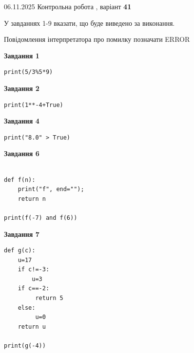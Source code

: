 \documentclass[12pt, ukrainian]{article}
\begin{document}
{\Large{06.11.2025 Контрольна робота , варіант  \No \textbf { 41 }\par}}
{
\begin {large}
У завданнях 1-9 вказати, що буде виведено за виконання.

Повідомлення інтерпретатора про помилку позначати ERROR

\begin{minipage}[t]{7.5cm}

\begin{center}
\textbf{Завдання 1}
\end{center}

\begin{verbatim}
print(5/3%5*9)
\end{verbatim}



\begin{center}
\textbf{Завдання 2}
\end{center}

\begin{verbatim}
print(1**-4+True)
\end{verbatim}



\begin{center}
\textbf{Завдання 4}
\end{center}

\begin{verbatim}
print("8.0" > True)
\end{verbatim}



\begin{center}
\textbf{Завдання 6}
\end{center}

\begin{verbatim}

def f(n):
    print("f", end="");
    return n

print(f(-7) and f(6))
\end{verbatim}



\begin{center}
\textbf{Завдання 7}
\end{center}

\begin{verbatim}
def g(c):
    u=17
    if c!=-3: 
        u=3
    if c==-2:
         return 5
    else:
         u=0
    return u

print(g(-4))
\end{verbatim}


\end{minipage}
\end{large}}
\end{document}
